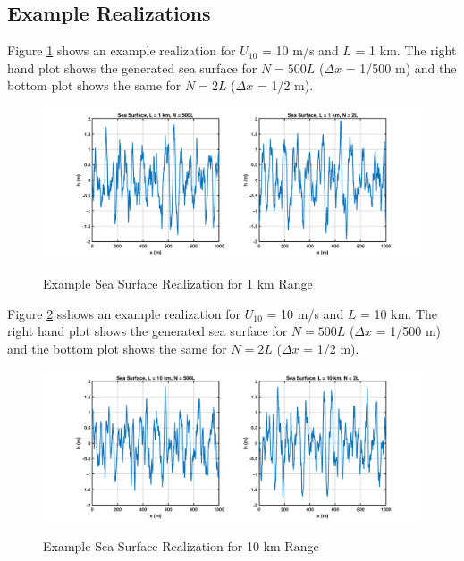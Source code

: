 \subsection{Example Realizations}
Figure \ref{os_fig:7a} shows an example realization for $U_{10}$ = 10 m/s and $L$ = 1 km. The right hand plot shows the generated sea surface for $N = 500L$ ($\Delta x$ = 1/500 m) and the bottom plot shows the same for $N=2L$ ($\Delta x$ = 1/2 m).
\begin{figure}[H]
  \begin{center}
\includegraphics[width=6in]{../media/Ocean_Surface/sea_surface_1000.png}
  \end{center}
  \renewcommand{\baselinestretch}{1} \small\normalsize
  \begin{quote}
    \caption[Example Sea Surface Realization for 1 km Range]{Example Sea Surface Realization for 1 km Range\label{os_fig:7a}}
  \end{quote}
\end{figure}
\renewcommand{\baselinestretch}{2} \small\normalsize

Figure \ref{os_fig:7aa} sshows an example realization for $U_{10}$ = 10 m/s and $L$ = 10 km. The right hand plot shows the generated sea surface for $N = 500L$ ($\Delta x$ = 1/500 m) and the bottom plot shows the same for $N=2L$ ($\Delta x$ = 1/2 m).
\begin{figure}[H]
  \begin{center}
\includegraphics[width=6in]{../media/Ocean_Surface/sea_surface_10000.png}
  \end{center}
  \renewcommand{\baselinestretch}{1} \small\normalsize
  \begin{quote}
    \caption[Example Sea Surface Realization for 10 km Range]{Example Sea Surface Realization for 10 km Range\label{os_fig:7aa}}
  \end{quote}
\end{figure}
\renewcommand{\baselinestretch}{2} \small\normalsize


